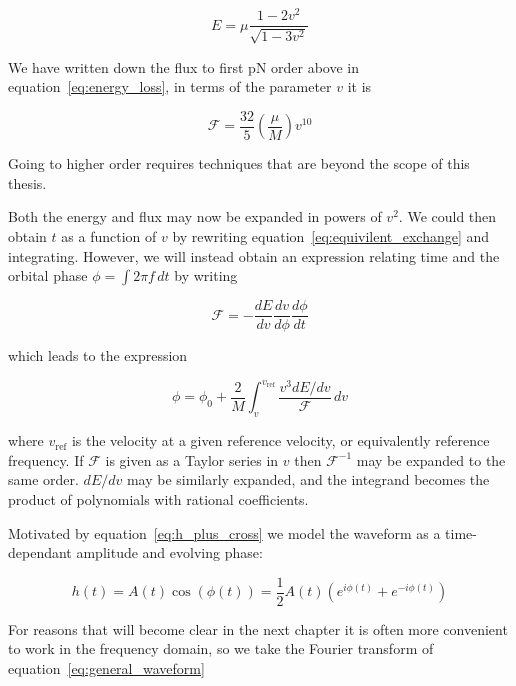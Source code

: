 \begin{equation}
E = \mu \frac{1-2v^2}{\sqrt{1-3v^2}} 
\end{equation}

We have written down the flux to first pN order above in
equation~\ref{eq:energy_loss}, in terms of the parameter $v$ it is

\begin{equation}
\mathcal{F} = \frac{32}{5} \left( \frac{\mu}{M} \right) v^{10}
\end{equation}

Going to higher order requires techniques that are beyond the scope of
this thesis.

Both the energy and flux may now be expanded in powers of $v^2$.  We
could then obtain $t$ as a function of $v$ by rewriting
equation~\ref{eq:equivilent_exchange} and integrating.  However, we
will instead obtain an expression relating time and the orbital phase
$\phi = \int 2\pi f\, dt$ by writing

\begin{equation*}
\mathcal{F} = - \frac{dE}{dv} \frac{dv}{d\phi} \frac{d\phi}{dt}
\end{equation*}

which leads to the expression

\begin{equation}
\label{eq:expansion_for_phi}
\phi = \phi_0 + \frac{2}{M} \int_v^{v_\mathrm{ref}} \frac{v^3
dE/dv}{\mathcal{F}}\, dv
\end{equation}

where $v_\mathrm{ref}$ is the velocity at a given reference velocity,
or equivalently reference frequency.  If $\mathcal{F}$ is given as a
Taylor series in $v$ then $\mathcal{F}^{-1}$ may be expanded to the
same order.  $dE/dv$ may be similarly expanded, and the integrand
becomes the product of polynomials with rational coefficients.

Motivated by equation~\ref{eq:h_plus_cross} we model the waveform as a
time-dependant amplitude and evolving phase:

\begin{equation}
\label{eq:general_waveform}
h(t) = A(t) \cos(\phi(t)) = \frac{1}{2} A(t) \left(e^{i\phi(t)} +
e^{-i\phi(t)} \right)
\end{equation}

For reasons that will become clear in the next chapter it is often more
convenient to work in the frequency domain, so we take the Fourier
transform of equation~\ref{eq:general_waveform}

